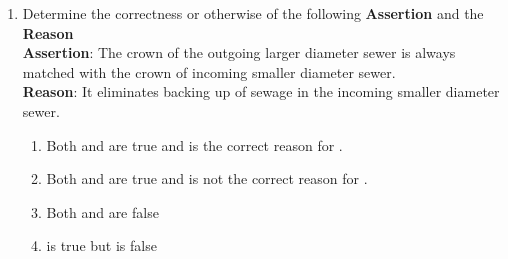 \documentclass[journal]{IEEEtran}
\begin{document}
\begin{enumerate}
\begin{tabular}{ |l| l|}
\end{tabular}
	\begin{multicols}{2}
	\begin{enumerate}
		\item P-3,Q-2,R-1,S-4
		\item P-4,Q-2,R-1,S-3
		\item P-4,Q-1,R-2,S-3
		\item P-4,Q-2,R-3,S-1
	\end{enumerate}
\end{multicols}
	\item Determine the correctness or otherwise of the following \textbf{Assertion } and the \textbf{Reason }\\
\textbf{Assertion}: The crown of the outgoing larger diameter sewer is always matched with the crown of incoming smaller diameter sewer.\\
\textbf{Reason}: It eliminates backing up of sewage in the incoming smaller diameter sewer.
	\begin{multicols}{2}
	\begin{enumerate}
		\item Both  and  are true and  is the correct reason for .
		\item Both  and  are true and  is not the correct reason for .

		\item Both  and  are false
		\item  {} is true but  is false


\end{enumerate}
\end{multicols}
\end{enumerate}
\end{document}
